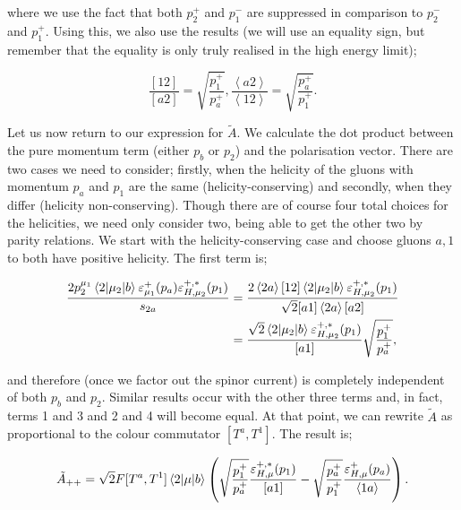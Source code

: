 where we use the fact that both $p_2^+$ and $p_1^-$ are suppressed in comparison to $p_2^-$ and $p_1^+$. Using this, we also use the results (we will use an equality sign, but remember that the equality is only truly realised in the high energy limit);

\begin{subequations}
\begin{equation}
\frac{[12]}{[a2]} = \sqrt{\frac{p_1^+}{p_a^+}},
\end{equation}
\begin{equation}
\frac{\left<a2\right>}{\left<12\right>} = \sqrt{\frac{p_a^+}{p_1^+}}.
\end{equation}
\end{subequations}

Let us now return to our expression for $\tilde{A}$. We calculate the dot product between the pure momentum term (either $p_b$ or $p_2$) and the polarisation vector. There are two cases we need to consider; firstly, when the helicity of the gluons with momentum $p_a$ and $p_1$ are the same (helicity-conserving) and secondly, when they differ (helicity non-conserving). Though there are of course four total choices for the helicities, we need only consider two, being able to get the other two by parity relations. We start with the helicity-conserving case and choose gluons $a,1$ to both have positive helicity. The first term is; 

\begin{equation}
\begin{split}
 \frac{2 p_2^{\mu_1} \mathinner{\langle2\vert\mu_2\vert b\rangle}_{} \varepsilon_{\mu_1}^+ (p_a) \varepsilon_{H,\mu_2}^{+,*}(p_1)}{s_{2a}} &= \frac{2 \left<2 a \right> [1 2] \mathinner{\langle2\vert\mu_2\vert b\rangle}_{}\varepsilon_{H,\mu_2}^{+,*}(p_1)}{\sqrt{2}[a 1] \left<2 a \right> [a 2]} \\
 &= \frac{\sqrt{2}\mathinner{\langle2\vert\mu_2\vert b\rangle}_{}\varepsilon_{H,\mu_2}^{+,*}(p_1)}{[a1]} \sqrt{\frac{p_1^+}{p_a^+}},
 \end{split}
\end{equation}

and therefore (once we factor out the spinor current) is completely independent of both $p_b$ and $p_2$. Similar results occur with the other three terms and, in fact, terms 1 and 3 and 2 and 4 will become equal. At that point, we can rewrite $\tilde{A}$ as proportional to the colour commutator $[T^a,T^1]$. The result is;

\begin{equation}
\tilde{A}_{++} = \sqrt{2} F [T^a,T^1] \mathinner{\langle2\vert\mu\vert b\rangle}_{} \left(\sqrt{\frac{p_1^+}{p_a^+}}\frac{\varepsilon_{H,\mu}^{+,*}(p_1)}{[a1]} - \sqrt{\frac{p_a^+}{p_1^+}}\frac{\varepsilon_{H,\mu}^{+}(p_a)}{ \left<1 a \right>} \right).
\end{equation}


